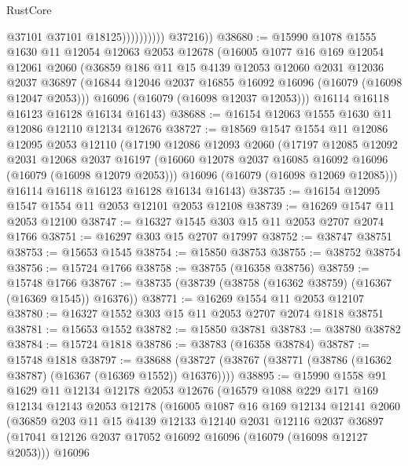 \begin{lexlean}{RustCore}
\begin{coremodule}
                            @37101
                            @37101
                            @18125))))))))))
        @37216))
@38680 := @15990
    @1078
    @1555
    @1630
    @11
    @12054
    @12063
    @2053
    @12678
    (@16005
      @1077
      @16
      @169
      @12054
      @12061
      @2060
      (@36859
        @186
        @11
        @15
        @4139
        @12053
        @12060
        @2031
        @12036
        @2037
        @36897
        (@16844 @12046 @2037 @16855 @16092 @16096 (@16079 (@16098 @12047 @2053)))
        @16096
        (@16079 (@16098 @12037 @12053)))
      @16114
      @16118
      @16123
      @16128
      @16134
      @16143)
@38688 := @16154 @12063 @1555 @1630 @11 @12086 @12110 @12134 @12676
@38727 := @18569
    @1547
    @1554
    @11
    @12086
    @12095
    @2053
    @12110
    (@17190
      @12086
      @12093
      @2060
      (@17197
        @12085
        @12092
        @2031
        @12068
        @2037
        @16197
        (@16060 @12078 @2037 @16085 @16092 @16096 (@16079 (@16098 @12079 @2053)))
        @16096
        (@16079 (@16098 @12069 @12085)))
      @16114
      @16118
      @16123
      @16128
      @16134
      @16143)
@38735 := @16154 @12095 @1547 @1554 @11 @2053 @12101 @2053 @12108
@38739 := @16269 @1547 @11 @2053 @12100
@38747 := @16327 @1545 @303 @15 @11 @2053 @2707 @2074 @1766
@38751 := @16297 @303 @15 @2707 @17997
@38752 := @38747 @38751
@38753 := @15653 @1545
@38754 := @15850 @38753
@38755 := @38752 @38754
@38756 := @15724 @1766
@38758 := @38755 (@16358 @38756)
@38759 := @15748 @1766
@38767 := @38735 (@38739 (@38758 (@16362 @38759) (@16367 (@16369 @1545)) @16376))
@38771 := @16269 @1554 @11 @2053 @12107
@38780 := @16327 @1552 @303 @15 @11 @2053 @2707 @2074 @1818 @38751
@38781 := @15653 @1552
@38782 := @15850 @38781
@38783 := @38780 @38782
@38784 := @15724 @1818
@38786 := @38783 (@16358 @38784)
@38787 := @15748 @1818
@38797 := @38688 (@38727 (@38767 (@38771 (@38786 (@16362 @38787) (@16367 (@16369 @1552)) @16376))))
@38895 := @15990
    @1558
    @91
    @1629
    @11
    @12134
    @12178
    @2053
    @12676
    (@16579
      @1088
      @229
      @171
      @169
      @12134
      @12143
      @2053
      @12178
      (@16005
        @1087
        @16
        @169
        @12134
        @12141
        @2060
        (@36859
          @203
          @11
          @15
          @4139
          @12133
          @12140
          @2031
          @12116
          @2037
          @36897
          (@17041 @12126 @2037 @17052 @16092 @16096 (@16079 (@16098 @12127 @2053)))
          @16096

\end{coremodule}
\end{lexlean}
